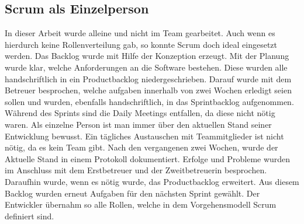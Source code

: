 \subsection{Scrum als Einzelperson}
In dieser Arbeit wurde alleine und nicht im Team gearbeitet. Auch wenn es hierdurch keine Rollenverteilung gab, so konnte Scrum doch ideal eingesetzt werden. Das Backlog wurde mit Hilfe der Konzeption erzeugt. Mit der Planung wurde klar, welche Anforderungen an die Software bestehen. Diese wurden alle handschriftlich in ein Productbacklog niedergeschrieben. Darauf wurde mit dem Betreuer besprochen, welche aufgaben innerhalb von zwei Wochen erledigt seien sollen und wurden, ebenfalls handschriftlich, in das Sprintbacklog aufgenommen. Während des Sprints sind die Daily Meetings entfallen, da diese nicht nötig waren. Als einzelne Person ist man immer über den aktuellen Stand seiner Entwicklung bewusst. Ein tägliches Austauschen mit Teammitglieder ist nicht nötig, da es kein Team gibt. Nach den vergangenen zwei Wochen, wurde der Aktuelle Stand in einem Protokoll dokumentiert. Erfolge und Probleme wurden im Anschluss mit dem Erstbetreuer und der Zweitbetreuerin besprochen. Daraufhin wurde, wenn es nötig wurde, das Productbacklog erweitert. Aus diesem  Backlog wurden erneut Aufgaben für den nächsten Sprint gewählt. Der Entwickler übernahm so alle Rollen, welche in dem Vorgehensmodell Scrum definiert sind.


